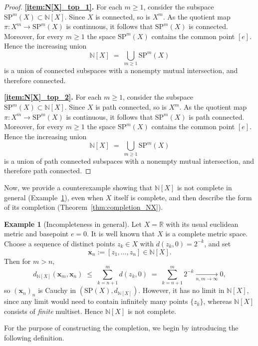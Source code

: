 \documentclass[10pt,a4paper]{article}
\theoremstyle{definition}
\newtheorem{example}[theorem]{Example}
\newcommand{\SP}{\mathrm{SP}}
\newcommand{\N}{\mathbb{N}}
\begin{document}
\begin{proof}
\noindent\textbf{\ref{item:N[X]_top_1}.}
For each $m \geq 1$, consider the subspace $\SP^m(X) \subset \N[X]$.
Since $X$ is connected, so is $X^m$. As the quotient map
$\pi \colon X^m \to \SP^m(X)$ is continuous, it follows that
$\SP^m(X)$ is connected. Moreover, for every $m \geq 1$ the space
$\SP^m(X)$ contains the common point $[e]$. Hence the increasing union
\[
\N[X] \;=\; \bigcup_{m \geq 1} \SP^m(X)
\]
is a union of connected subspaces with a nonempty mutual intersection, and
therefore connected.

\smallskip
\noindent\textbf{\ref{item:N[X]_top_2}.}
For each $m \geq 1$, consider the subspace $\SP^m(X) \subset \N[X]$.
Since $X$ is path connected, so is $X^m$. As the quotient map
$\pi \colon X^m \to \SP^m(X)$ is continuous, it follows that
$\SP^m(X)$ is path connected. Moreover, for every $m \geq 1$ the space
$\SP^m(X)$ contains the common point $[e]$. Hence the increasing union
\[
\N[X] \;=\; \bigcup_{m \geq 1} \SP^m(X)
\]
is a union of path connected subspaces with a nonempty mutual intersection, and
therefore path connected.

\end{proof}

Now, we provide a counterexample showing that $\N[X]$ is not complete in
general (Example~\ref{example:incomplete}), even when $X$ itself is complete, and then describe the form of its
completion (Theorem~\ref{thm:completion_NX}).


\begin{example}[Incompleteness in general]\label{example:incomplete}
Let $X=\mathbb{R}$ with its usual euclidean metric and basepoint $e=0$. It is well known that $X$ is a complete metric space.
Choose a sequence of distinct points $z_k\in X$ with $d(z_k,0)=2^{-k}$,
and set
\[
\mathbf{x}_n := [z_1,\dots,z_n]\in \N[X].
\]
Then for $m>n$,
\[
d_{\N[X]}(\mathbf{x}_m,\mathbf{x}_n)\;\le\;\sum_{k=n+1}^{m} d(z_k,0)
\;=\;\sum_{k=n+1}^{m} 2^{-k}\xrightarrow[n,m\to\infty]{}0,
\]
so $(\mathbf{x}_n)_n$ is Cauchy in $(\SP(X),d_{\N[X]})$.
However, it has no limit in $\N[X]$, since any limit would need to contain
infinitely many points $\{z_k\}$, whereas $\N[X]$ consists of \emph{finite}
multiset. Hence $\N[X]$ is not complete.
\end{example}

For the purpose of constructing the completion, we begin by introducing the
following definition.
\end{document}
